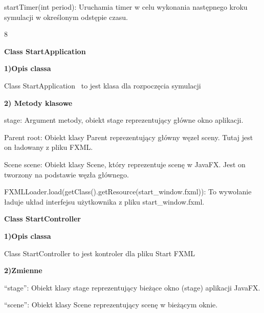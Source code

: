 \documentclass[a4paper]{article}
\begin{document}
\foreignlanguage{polish}{startTimer(int period): Uruchamia timer w celu wykonania następnego kroku symulacji w
określonym odstępie czasu.}
\begin{center}
	8
\end{center}
\newpage


\bigskip


\bigskip

{\centering
\foreignlanguage{polish}{\textbf{Class StartApplication}}
\par}
\vspace{6pt}
\foreignlanguage{polish}{\textbf{1)Opis classa}}

\foreignlanguage{polish}{Class StartApplication \ to jest klasa dla rozpoczęcia symulacji}


\bigskip

\foreignlanguage{polish}{\textbf{2) Metody klasowe}}


\foreignlanguage{polish}{stage: Argument metody, obiekt stage reprezentujący główne okno aplikacji.}

\foreignlanguage{polish}{Parent root: Obiekt klasy Parent reprezentujący główny węzeł sceny. Tutaj jest on ładowany z
pliku FXML.}

\foreignlanguage{polish}{Scene scene: Obiekt klasy Scene, który reprezentuje scenę w JavaFX. Jest on tworzony na
podstawie węzła głównego.}

\foreignlanguage{polish}{FXMLLoader.load(getClass().getResource({\textquotedbl}start\_window.fxml{\textquotedbl})): To
wywołanie ładuje układ interfejsu użytkownika z pliku start\_window.fxml.}




\bigskip


\bigskip

{\centering
\foreignlanguage{english}{\textbf{Class StartController}}
\par}
\vspace{6pt}
\foreignlanguage{english}{\textbf{1)Opis classa}}

\foreignlanguage{english}{Class StartController to jest kontroler dla pliku Start FXML}



\bigskip

\foreignlanguage{polish}{\textbf{2)Zmienne}}

\foreignlanguage{polish}{“stage”: Obiekt klasy stage reprezentujący bieżące okno (stage) aplikacji JavaFX.}

\foreignlanguage{polish}{“scene”: Obiekt klasy Scene reprezentujący scenę w bieżącym oknie.}
\end{document}
